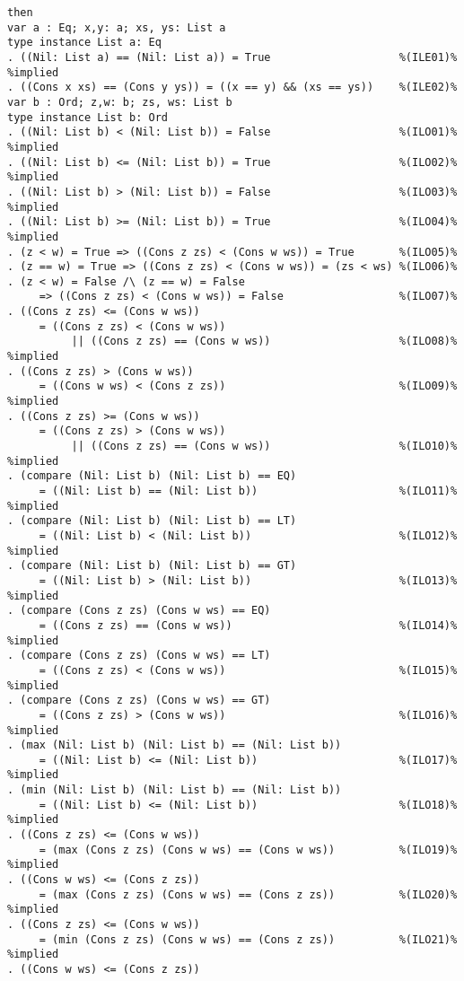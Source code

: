 \begin{Verbatim}
then
var a : Eq; x,y: a; xs, ys: List a
type instance List a: Eq
. ((Nil: List a) == (Nil: List a)) = True                    %(ILE01)% %implied
. ((Cons x xs) == (Cons y ys)) = ((x == y) && (xs == ys))    %(ILE02)%
var b : Ord; z,w: b; zs, ws: List b
type instance List b: Ord
. ((Nil: List b) < (Nil: List b)) = False                    %(ILO01)% %implied
. ((Nil: List b) <= (Nil: List b)) = True                    %(ILO02)% %implied
. ((Nil: List b) > (Nil: List b)) = False                    %(ILO03)% %implied
. ((Nil: List b) >= (Nil: List b)) = True                    %(ILO04)% %implied
. (z < w) = True => ((Cons z zs) < (Cons w ws)) = True       %(ILO05)%
. (z == w) = True => ((Cons z zs) < (Cons w ws)) = (zs < ws) %(ILO06)%
. (z < w) = False /\ (z == w) = False
     => ((Cons z zs) < (Cons w ws)) = False                  %(ILO07)%
. ((Cons z zs) <= (Cons w ws))
     = ((Cons z zs) < (Cons w ws)) 
          || ((Cons z zs) == (Cons w ws))                    %(ILO08)% %implied
. ((Cons z zs) > (Cons w ws))
     = ((Cons w ws) < (Cons z zs))                           %(ILO09)% %implied
. ((Cons z zs) >= (Cons w ws))
     = ((Cons z zs) > (Cons w ws)) 
          || ((Cons z zs) == (Cons w ws))                    %(ILO10)% %implied
. (compare (Nil: List b) (Nil: List b) == EQ)
     = ((Nil: List b) == (Nil: List b))                      %(ILO11)% %implied
. (compare (Nil: List b) (Nil: List b) == LT)
     = ((Nil: List b) < (Nil: List b))                       %(ILO12)% %implied
. (compare (Nil: List b) (Nil: List b) == GT)
     = ((Nil: List b) > (Nil: List b))                       %(ILO13)% %implied
. (compare (Cons z zs) (Cons w ws) == EQ)
     = ((Cons z zs) == (Cons w ws))                          %(ILO14)% %implied
. (compare (Cons z zs) (Cons w ws) == LT)
     = ((Cons z zs) < (Cons w ws))                           %(ILO15)% %implied
. (compare (Cons z zs) (Cons w ws) == GT)
     = ((Cons z zs) > (Cons w ws))                           %(ILO16)% %implied
. (max (Nil: List b) (Nil: List b) == (Nil: List b)) 
     = ((Nil: List b) <= (Nil: List b))                      %(ILO17)% %implied
. (min (Nil: List b) (Nil: List b) == (Nil: List b)) 
     = ((Nil: List b) <= (Nil: List b))                      %(ILO18)% %implied
. ((Cons z zs) <= (Cons w ws))
     = (max (Cons z zs) (Cons w ws) == (Cons w ws))          %(ILO19)% %implied
. ((Cons w ws) <= (Cons z zs))
     = (max (Cons z zs) (Cons w ws) == (Cons z zs))          %(ILO20)% %implied
. ((Cons z zs) <= (Cons w ws))
     = (min (Cons z zs) (Cons w ws) == (Cons z zs))          %(ILO21)% %implied
. ((Cons w ws) <= (Cons z zs))

\end{Verbatim}
